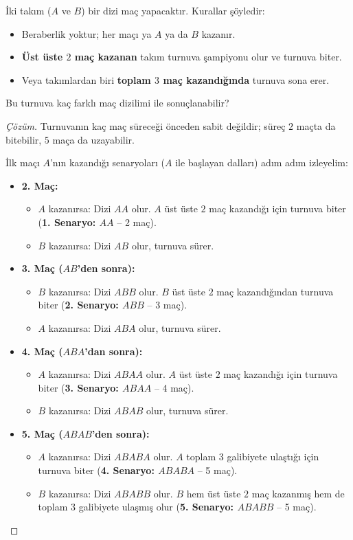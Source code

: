 \begin{example}
İki takım ($A$ ve $B$) bir dizi maç yapacaktır. Kurallar şöyledir:
\begin{itemize}
  \item Beraberlik yoktur; her maçı ya $A$ ya da $B$ kazanır.
  \item \textbf{Üst üste $2$ maç kazanan} takım turnuva şampiyonu olur ve turnuva biter.
  \item Veya takımlardan biri \textbf{toplam $3$ maç kazandığında} turnuva sona erer.
\end{itemize}
Bu turnuva kaç farklı maç dizilimi ile sonuçlanabilir?
\end{example}
\begin{proof}[Çözüm]
Turnuvanın kaç maç süreceği önceden sabit değildir; süreç $2$ maçta da bitebilir, $5$ maça da uzayabilir.

İlk maçı $A$'nın kazandığı senaryoları ($A$ ile başlayan dalları) adım adım izleyelim:
\begin{itemize}
  \item \textbf{2. Maç:}
  \begin{itemize}
    \item $A$ kazanırsa: Dizi $AA$ olur. $A$ üst üste $2$ maç kazandığı için turnuva biter (\textbf{1. Senaryo: $AA$} -- 2 maç).
    \item $B$ kazanırsa: Dizi $AB$ olur, turnuva sürer.
  \end{itemize}
  \item \textbf{3. Maç ($AB$'den sonra):}
  \begin{itemize}
    \item $B$ kazanırsa: Dizi $ABB$ olur. $B$ üst üste $2$ maç kazandığından turnuva biter (\textbf{2. Senaryo: $ABB$} -- 3 maç).
    \item $A$ kazanırsa: Dizi $ABA$ olur, turnuva sürer.
  \end{itemize}
  \item \textbf{4. Maç ($ABA$'dan sonra):}
  \begin{itemize}
    \item $A$ kazanırsa: Dizi $ABAA$ olur. $A$ üst üste $2$ maç kazandığı için turnuva biter (\textbf{3. Senaryo: $ABAA$} -- 4 maç).
    \item $B$ kazanırsa: Dizi $ABAB$ olur, turnuva sürer.
  \end{itemize}
  \item \textbf{5. Maç ($ABAB$'den sonra):}
  \begin{itemize}
    \item $A$ kazanırsa: Dizi $ABABA$ olur. $A$ toplam $3$ galibiyete ulaştığı için turnuva biter (\textbf{4. Senaryo: $ABABA$} -- 5 maç).
    \item $B$ kazanırsa: Dizi $ABABB$ olur. $B$ hem üst üste $2$ maç kazanmış hem de toplam $3$ galibiyete ulaşmış olur (\textbf{5. Senaryo: $ABABB$} -- 5 maç).
  \end{itemize}
\end{itemize}


\end{proof}
